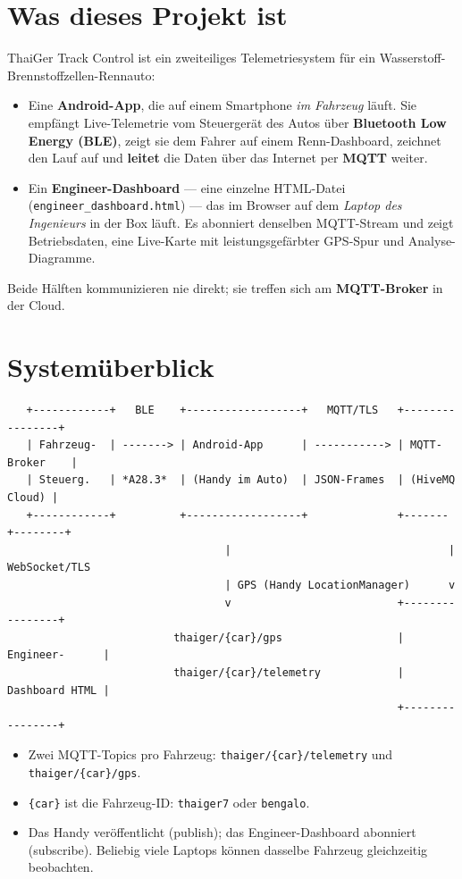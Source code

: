 \documentclass[11pt,a4paper,oneside]{report}
\newcommand{\code}[1]{\texttt{#1}}
\begin{document}
\section{Was dieses Projekt ist}
ThaiGer Track Control ist ein zweiteiliges Telemetriesystem f\"ur ein
Wasserstoff-Brennstoffzellen-Rennauto:
\begin{itemize}
  \item Eine \textbf{Android-App}, die auf einem Smartphone \emph{im Fahrzeug}
    l\"auft. Sie empf\"angt Live-Telemetrie vom Steuerger\"at des Autos \"uber
    \textbf{Bluetooth Low Energy (BLE)}, zeigt sie dem Fahrer auf einem
    Renn-Dashboard, zeichnet den Lauf auf und \textbf{leitet} die Daten \"uber das
    Internet per \textbf{MQTT} weiter.
  \item Ein \textbf{Engineer-Dashboard} --- eine einzelne HTML-Datei
    (\code{engineer\_dashboard.html}) --- das im Browser auf dem \emph{Laptop des
    Ingenieurs} in der Box l\"auft. Es abonniert denselben MQTT-Stream und zeigt
    Betriebsdaten, eine Live-Karte mit leistungsgef\"arbter GPS-Spur und
    Analyse-Diagramme.
\end{itemize}
Beide H\"alften kommunizieren nie direkt; sie treffen sich am \textbf{MQTT-Broker}
in der Cloud.

\section{System\"uberblick}

\begin{lstlisting}
   +------------+   BLE    +------------------+   MQTT/TLS   +----------------+
   | Fahrzeug-  | -------> | Android-App      | -----------> | MQTT-Broker    |
   | Steuerg.   | *A28.3*  | (Handy im Auto)  | JSON-Frames  | (HiveMQ Cloud) |
   +------------+          +------------------+              +-------+--------+
                                  |                                  | WebSocket/TLS
                                  | GPS (Handy LocationManager)      v
                                  v                          +----------------+
                          thaiger/{car}/gps                  | Engineer-      |
                          thaiger/{car}/telemetry            | Dashboard HTML |
                                                             +----------------+
\end{lstlisting}
\begin{itemize}
  \item Zwei MQTT-Topics pro Fahrzeug: \code{thaiger/\{car\}/telemetry} und
    \code{thaiger/\{car\}/gps}.
  \item \code{\{car\}} ist die Fahrzeug-ID: \code{thaiger7} oder \code{bengalo}.
  \item Das Handy ver\"offentlicht (publish); das Engineer-Dashboard abonniert
    (subscribe). Beliebig viele Laptops k\"onnen dasselbe Fahrzeug gleichzeitig
    beobachten.
\end{itemize}
\end{document}

